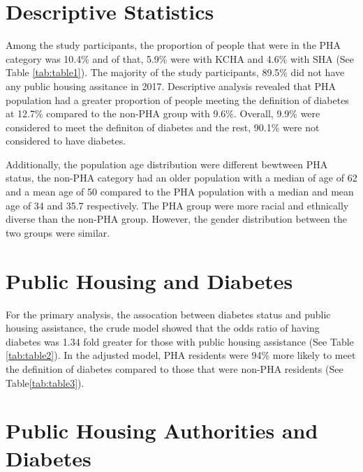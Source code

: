 \documentclass [11pt, proquest] {uwthesis}[2015/03/03]
\begin{document}
\section{Descriptive Statistics}\label{descriptive-statistics}

Among the study participants, the proportion of people that were in the
PHA category was 10.4\% and of that, 5.9\% were with KCHA and 4.6\% with
SHA (See Table \ref{tab:table1}). The majority of the study
participants, 89.5\% did not have any public housing assitance in 2017.
Descriptive analysis revealed that PHA population had a greater
proportion of people meeting the definition of diabetes at 12.7\%
compared to the non-PHA group with 9.6\%. Overall, 9.9\% were considered
to meet the definiton of diabetes and the rest, 90.1\% were not
considered to have diabetes.

Additionally, the population age distribution were different bewtween
PHA status, the non-PHA category had an older population with a median
of age of 62 and a mean age of 50 compared to the PHA population with a
median and mean age of 34 and 35.7 respectively. The PHA group were more
racial and ethnically diverse than the non-PHA group. However, the
gender distribution between the two groups were similar.

\section{Public Housing and Diabetes}\label{public-housing-and-diabetes}

For the primary analysis, the assocation between diabetes status and
public housing assistance, the crude model showed that the odds ratio of
having diabetes was 1.34 fold greater for those with public housing
assistance (See Table \ref{tab:table2}). In the adjusted model, PHA
residents were 94\% more likely to meet the definition of diabetes
compared to those that were non-PHA residents (See
Table\ref{tab:table3}).

\section{Public Housing Authorities and
Diabetes}\label{public-housing-authorities-and-diabetes}
\end{document}
